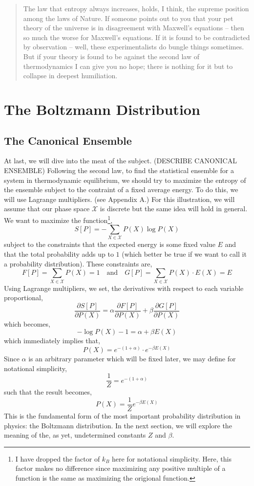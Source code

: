 \documentclass[11pt,a4paper]{article}
\newcommand{\pderiv}[2]{\frac{\partial{#1}}{\partial{#2}}}
\theoremstyle{theorem}
\theoremstyle{definition}
\theoremstyle{definition}
\theoremstyle{remark}
\theoremstyle{definition}
\theoremstyle{remark}
\newcommand{\phase}{\mathscr{X}}
\begin{document}
\begin{quote}
The law that entropy always increases, holds, I think, the supreme position among the laws of Nature. If someone points out to you that your pet theory of the universe is in disagreement with Maxwell's equations -- then so much the worse for Maxwell's equations. If it is found to be contradicted by observation -- well, these experimentalists do bungle things sometimes. But if your theory is found to be against the second law of thermodynamics I can give you no hope; there is nothing for it but to collapse in deepest humiliation.
\end{quote}


\section{The Boltzmann Distribution}

\subsection{The Canonical Ensemble}

At last, we will dive into the meat of the subject. (DESCRIBE CANONICAL ENSEMBLE) Following the second law, to find the statistical ensemble for a system in thermodynamic equilibrium, we should try to maximize the entropy of the ensemble subject to the contraint of a fixed average energy. To do this, we will use Lagrange multipliers. (see Appendix A.) For this illustration, we will assume that our phase space $\phase$ is discrete but the same idea will hold in general. We want to maximize the function\footnote{I have dropped the factor of $k_B$ here for notational simplicity. Here, this factor makes no difference since maximizing any positive multiple of a function is the same as maximizing the origional function.},
\[S[P] = - \sum_{X \in \phase} P(X) \log{P(X)} \]
subject to the constraints that the expected energy is some fixed value $E$ and that the total probability adds up to $1$ (which better be true if we want to call it a probability distribution). These constraints are,
\[ F[P] = \sum_{X \in \phase} P(X) = 1 \quad \text{and} \quad G[P] = \sum_{X \in \phase}  P(X) \cdot E(X) = E \]
Using Lagrange multipliers, we set, the derivatives with respect to each variable proportional,
\[ \pderiv{S[P]}{P(X)} = \alpha \pderiv{F[P]}{P(X)} + \beta \pderiv{G[P]}{P(X)} \]
which becomes,
\[ - \log{P(X)} - 1 = \alpha + \beta E(X) \]
which immediately implies that,
\[ P(X) = e^{-(1 + \alpha)} \cdot e^{- \beta E(X)} \]
Since $\alpha$ is an arbitrary parameter which will be fixed later, we may define for notational simplicity,
\[ \frac{1}{Z} = e^{-(1 + \alpha)} \]
such that the result becomes,
\[ P(X) = \frac{1}{Z} e^{-\beta E(X)} \]
This is the fundamental form of the most important probability distribution in physics: the Boltzmann distribution. In the next section, we will explore the meaning of the, as yet, undetermined constants $Z$ and $\beta$.
\end{document}
